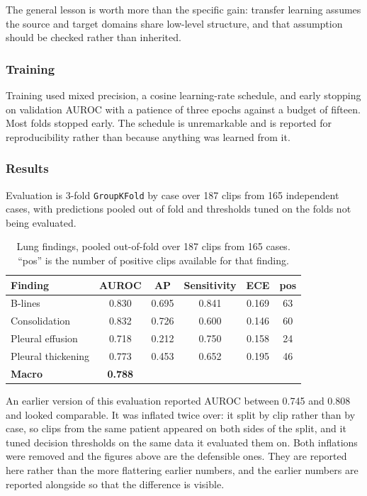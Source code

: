 The general lesson is worth more than the specific gain: transfer learning assumes the source
and target domains share low-level structure, and that assumption should be checked rather than
inherited.

\subsubsection{Training}

Training used mixed precision, a cosine learning-rate schedule, and early stopping on validation
AUROC with a patience of three epochs against a budget of fifteen. Most folds stopped early. The
schedule is unremarkable and is reported for reproducibility rather than because anything was
learned from it.

\subsubsection{Results}
\label{subsec:lung-results}

Evaluation is 3-fold \texttt{GroupKFold} by case over 187 clips from 165 independent cases, with
predictions pooled out of fold and thresholds tuned on the folds not being evaluated.

\begin{table}[H]
  \centering
  \small
  \caption{Lung findings, pooled out-of-fold over 187 clips from 165 cases. ``pos'' is the
    number of positive clips available for that finding.}
  \label{tab:lung-results}
  \begin{tabular}{@{}lccccc@{}}
    \toprule
    Finding & AUROC & AP & Sensitivity & ECE & pos \\
    \midrule
    B-lines & 0.830 & 0.695 & 0.841 & 0.169 & 63 \\
    Consolidation & 0.832 & 0.726 & 0.600 & 0.146 & 60 \\
    Pleural effusion & 0.718 & 0.212 & 0.750 & 0.158 & 24 \\
    Pleural thickening & 0.773 & 0.453 & 0.652 & 0.195 & 46 \\
    \midrule
    \textbf{Macro} & \textbf{0.788} & & & & \\
    \bottomrule
  \end{tabular}
\end{table}

An earlier version of this evaluation reported AUROC between 0.745 and 0.808 and looked
comparable. It was inflated twice over: it split by clip rather than by case, so clips from the
same patient appeared on both sides of the split, and it tuned decision thresholds on the same
data it evaluated them on. Both inflations were removed and the figures above are the
defensible ones. They are reported here rather than the more flattering earlier numbers, and
the earlier numbers are reported alongside so that the difference is visible.

